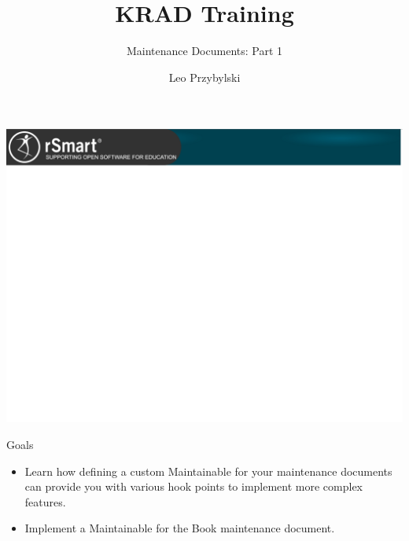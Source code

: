 \documentclass[xcolor=dvipsnames,14pt,professionalfonts]{beamer}
\begin{document}
\title{KRAD Training}
\subtitle{Maintenance Documents: Part 1}
\author[Leo]{Leo Przybylski}

\usebackgroundtemplate%
{%
    \includegraphics[width=\paperwidth,height=\paperheight]{../img/header.png}%
}

{
%
\begin{frame}[plain]
  \titlepage
\end{frame}
}

\begin{frame}{Goals}
  \begin{itemize}
 \item Learn how defining a custom Maintainable for your maintenance documents can provide you with various hook points to implement more complex features.
 \item Implement a Maintainable for the Book maintenance document.
\end{itemize}
\end{frame}
\end{document}
